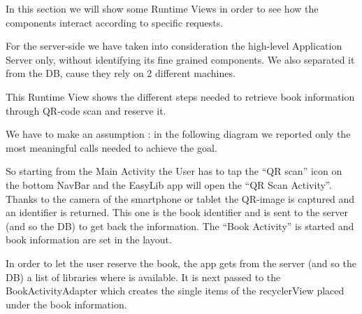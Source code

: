 \vspace*{-5mm}
In this section we will show some Runtime Views in order to see how the components interact according to specific requests.\par
For the server-side we have taken into consideration the high-level Application Server only, without identifying its fine grained components. We also separated it from the DB, cause they rely on 2 different machines.

\vspace*{0.5cm}

This Runtime View shows the different steps needed to retrieve book information through QR-code scan and reserve it.\par
We have to make an assumption : in the following diagram we reported only the most meaningful calls needed to achieve the goal.\par
So starting from the Main Activity the User has to tap the “QR scan” icon on the bottom NavBar and the EasyLib app will open the “QR Scan Activity”. Thanks to the camera of the smartphone or tablet the QR-image is captured and an identifier is returned. This one is the book identifier and is sent to the server (and so the DB) to get back the information. The “Book Activity” is started and book information are set in the layout.\par
In order to let the user reserve the book, the app gets from the server (and so the DB) a list of libraries where is available. It is next passed to the BookActivityAdapter which creates the single items of the recyclerView placed under the book information.
\newpage
\vspace*{0cm}
